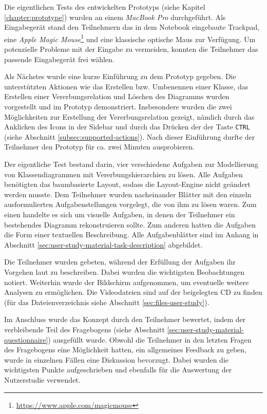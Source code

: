 Die eigentlichen Tests des entwickelten Prototyps (siehe Kapitel \ref{chapter:prototype}) wurden an einem \textit{MacBook Pro} durchgeführt. Als Eingabegerät stand den Teilnehmern das in dem Notebook eingebaute Trackpad, eine \textit{Apple Magic Mouse}\footnote{\url{https://www.apple.com/magicmouse}} und eine klassische optische Maus zur Verfügung. Um potenzielle Probleme mit der Eingabe zu vermeiden, konnten die Teilnehmer das passende Eingabegerät frei wählen.

Als Nächstes wurde eine kurze Einführung zu dem Prototyp gegeben. Die unterstützten Aktionen wie das Erstellen bzw. Umbenennen einer Klasse, das Erstellen einer Vererbungsrelation und Löschen des Diagramms wurden vorgestellt und im Prototyp demonstriert. Insbesondere wurden die zwei Möglichkeiten zur Erstellung der Vererbungsrelation gezeigt, nämlich durch das Anklicken des Icons in der Sidebar und durch das Drücken der der Taste \texttt{CTRL} (siehe Abschnitt \ref{subsec:supported-actions}). Nach dieser Einführung durfte der Teilnehmer den Prototyp für ca. zwei Minuten ausprobieren.

Der eigentliche Test bestand darin, vier verschiedene Aufgaben zur Modellierung von Klassendiagrammen mit Vererbungshierarchien zu lösen. Alle Aufgaben benötigten das baumbasierte Layout, sodass die Lay\-out-Engine nicht geändert werden musste. Dem Teilnehmer wurden nacheinander Blätter mit den einzeln ausformulierten Aufgabenstellungen vorgelegt, die von ihm zu lösen waren. Zum einen handelte es sich um visuelle Aufgaben, in denen der Teilnehmer ein bestehendes Diagramm rekonstruieren sollte. Zum anderen hatten die Aufgaben die Form einer textuellen Beschreibung. Alle Aufgabenblätter sind im Anhang in Abschnitt \ref{sec:user-study-material-task-description} abgebildet.

Die Teilnehmer wurden gebeten, während der Erfüllung der Aufgaben ihr Vorgehen laut zu beschreiben. Dabei wurden die wichtigsten Beobachtungen notiert. Weiterhin wurde der Bildschirm aufgenommen, um eventuelle weitere Analysen zu ermöglichen. Die Videodateien sind auf der beigelegten CD zu finden (für das Dateienverzeichnis siehe Abschnitt \ref{sec:files-user-study}).

Im Anschluss wurde das Konzept durch den Teilnehmer bewertet, indem der verbleibende Teil des Fragebogens (siehe Abschnitt \ref{sec:user-study-material-questionnaire}) ausgefüllt wurde. Obwohl die Teilnehmer in den letzten Fragen des Fragebogens eine Möglichkeit hatten, ein allgemeines Feedback zu geben, wurde in einzelnen Fällen eine Diskussion bevorzugt. Dabei wurden die wichtigsten Punkte aufgeschrieben und ebenfalls für die Auswertung der Nutzerstudie verwendet.

